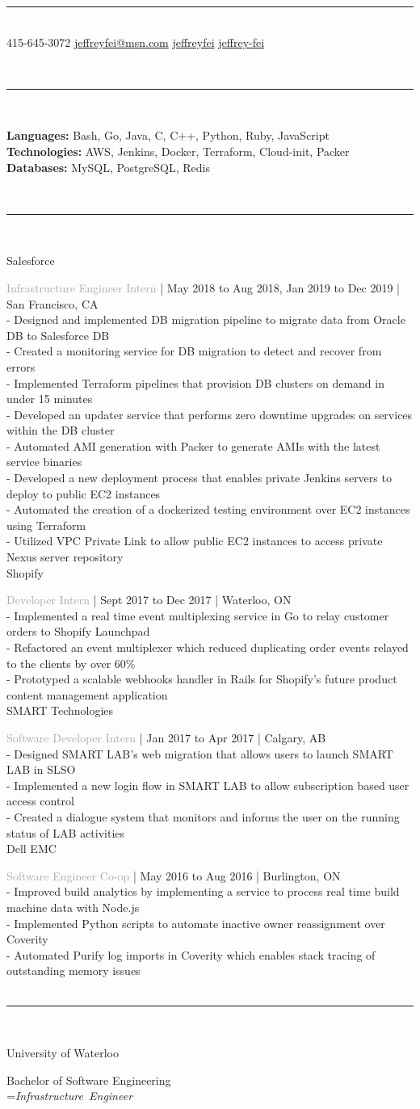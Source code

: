 \documentclass[12pt]{article}
\newcommand{\placetextbox}[3]{%
  \setbox0=\hbox{#3}%
  \AddToShipoutPictureFG*{%
    \put(\LenToUnit{#1\paperwidth},\LenToUnit{#2\paperheight}){\vtop{{\null}\makebox[0pt][c]{#3}}}%
  }%
}%
\newcommand{\cvsection}[1]{
    \\[0.2in]
    \indent \fontsize{18}{18}\selectfont{#1}
    \noindent\rule{\textwidth}{1pt}\\[0.1in]
    \fontsize{12}{15}\selectfont
}
\newcommand{\cmpname}[1]{
    \fontsize{15}{15}\selectfont
    \indent #1 \\[0.03in]
    \fontsize{12}{15}\selectfont
}
\newcommand{\position}[3]{
    \fontsize{12}{15}\selectfont
    \indent \textcolor{darkgray}{#1}
    \fontsize{10}{12}\selectfont
    | #2 | #3 \\[0.04in]
}
\newcommand{\secbullet}[1]{
    \fontsize{12}{15}\selectfont
    \indent - #1\\[0.02in]
}
\newcommand{\secendbullet}[1]{
    \fontsize{12}{15}\selectfont
    \indent - #1\\[0.1in]
}
\newcommand{\cvsubsection}[1]{
    \fontsize{12}{15}\selectfont
    \indent #1\\[0.1in]
}
\begin{document}
\fontsize{33}{33}\selectfont{Jeffrey Fei}
\noindent\rule{\textwidth}{1pt}\\[0.05in]
\fontsize{11}{13}\selectfont
\indent \faPhone\hspace{0.05in} 415-645-3072
\indent \faEnvelope\hspace{0.05in}\href{mailto:jeffreyfei@msn.com}{jeffreyfei@msn.com}
\indent \faGithub\hspace{0.05in}\href{https://github.com/jeffreyfei}{jeffreyfei}
\indent \faLinkedin\hspace{0.05in}\href{https://www.linkedin.com/in/jeffrey-fei/}{jeffrey-fei}
\cvsection{Skills}
\indent \textbf{Languages:} Bash, Go, Java, C, C++, Python, Ruby, JavaScript\\
\indent \textbf{Technologies:} AWS, Jenkins, Docker, Terraform, Cloud-init, Packer\\
\indent \textbf{Databases:} MySQL, PostgreSQL, Redis
\cvsection{Employment}
\cmpname{Salesforce}
\position{Infrastructure Engineer Intern}{May 2018 to Aug 2018, Jan 2019 to Dec 2019}{San Francisco, CA}
\secbullet{Designed and implemented DB migration pipeline to migrate data from Oracle DB to Salesforce DB}
\secbullet{Created a monitoring service for DB migration to detect and recover from errors}
\secbullet{Implemented Terraform pipelines that provision DB clusters on demand in under 15 minutes}
\secbullet{Developed an updater service that performs zero downtime upgrades on services within the DB cluster}
\secbullet{Automated AMI generation with Packer to generate AMIs with the latest service binaries}
\secbullet{Developed a new deployment process that enables private Jenkins servers to deploy to public EC2 instances}
\secbullet{Automated the creation of a dockerized testing environment over EC2 instances using Terraform}
\secendbullet{Utilized VPC Private Link to allow public EC2 instances to access private Nexus server repository}
\cmpname{Shopify}
\position{Developer Intern}{Sept 2017 to Dec 2017}{Waterloo, ON}
\secbullet{Implemented a real time event multiplexing service in Go to relay customer orders to Shopify Launchpad}
\secbullet{Refactored an event multiplexer which reduced duplicating order events relayed to the clients by over 60\%}
\secendbullet{Prototyped a scalable webhooks handler in Rails for Shopify’s future product content management application}
\cmpname{SMART Technologies}
\position{Software Developer Intern}{Jan 2017 to Apr 2017}{Calgary, AB}
\secbullet{Designed SMART LAB's web migration that allows users to launch SMART LAB in SLSO}
\secbullet{Implemented a new login flow in SMART LAB to allow subscription based user access control}
\secendbullet{Created a dialogue system that monitors and informs the user on the running status of LAB activities}
\cmpname{Dell EMC}
\position{Software Engineer Co-op}{May 2016 to Aug 2016}{Burlington, ON}
\secbullet{Improved build analytics by implementing a service to process real time build machine data with Node.js}
\secbullet{Implemented Python scripts to automate inactive owner reassignment over Coverity}
\secbullet{Automated Purify log imports in Coverity which enables stack tracing of outstanding memory issues}
\cvsection{Education}
\cmpname{University of Waterloo}
\cvsubsection{Bachelor of Software Engineering}
\placetextbox{0.86}{0.955}{\fontsize{13}{13}\selectfont \textit{Infrastructure Engineer}}%
\end{document}
